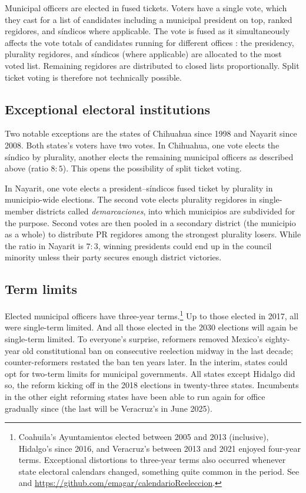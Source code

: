\documentclass[letter,12pt]{article}
\begin{document}
Municipal officers are elected in fused tickets. Voters have a single vote, which they cast for a list of candidates including a municipal president on top, ranked regidores, and síndicos where applicable. The vote is fused as it simultaneously affects the vote totals of candidates running for different offices \citep[see ][:42]{cox.1997}: the presidency, plurality regidores, and síndicos (where applicable) are allocated to the most voted list. Remaining regidores are distributed to closed lists proportionally. Split ticket voting is therefore not technically possible.

\subsection{Exceptional electoral institutions}
Two notable exceptions are the states of Chihuahua since 1998 and Nayarit since 2008. Both states's voters have two votes. In Chihuahua, one vote elects the síndico by plurality, another elects the remaining municipal officers as described above (ratio $8:5$). This opens the possibility of split ticket voting.

In Nayarit, one vote elects a president--síndicos fused ticket by plurality in municipio-wide elections. The second vote elects plurality regidores in single-member districts called \emph{demarcaciones}, into which municipios are subdivided for the purpose. Second votes are then pooled in a secondary district (the municipio as a whole) to distribute PR regidores among the strongest plurality losers. While the ratio in Nayarit is $7:3$, winning presidents could end up in the council minority unless their party secures enough district victories.

\subsection{Term limits}
Elected municipal officers have three-year terms.\footnote{Coahuila's Ayuntamientos elected between 2005 and 2013 (inclusive), Hidalgo's since 2016, and Veracruz's between 2013 and 2021 enjoyed four-year terms. Exceptional distortions to three-year terms also occurred whenever state electoral calendars changed, something quite common in the period. See \citet{magarInstReel.2017} and \url{https://github.com/emagar/calendarioReeleccion}.} Up to those elected in 2017, all were single-term limited. And all those elected in the 2030 elections will again be single-term limited. To everyone's surprise, reformers removed Mexico's eighty-year old constitutional ban on consecutive reelection midway in the last decade; counter-reformers restated the ban ten years later. In the interim, states could opt for two-term limits for municipal governments. All states except Hidalgo did so, the reform kicking off in the 2018 elections in twenty-three states. Incumbents in the other eight reforming states have been able to run again for office gradually since (the last will be Veracruz's in June 2025). 
\end{document}
